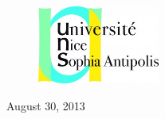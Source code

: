 \documentclass[11pt]{report}
\begin{document}
\begin{titlepage}
\begin{figure}[!t]
\includegraphics[width=4cm]{pictures/logo.jpg} 
\end{figure}




{\large August 30, 2013}\\[3cm] %



 

\vfill %

\end{titlepage}
\end{document}
